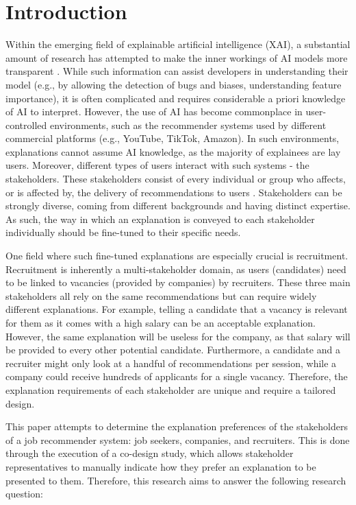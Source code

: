 \section{Introduction}
Within the emerging field of explainable artificial intelligence (XAI), a substantial amount of research has attempted to make the inner workings of AI models more transparent \cite{hagras2018toward,mei2023users}. While such information can assist developers in understanding their model (e.g., by allowing the detection of bugs and biases, understanding feature importance), it is often complicated and requires considerable a priori knowledge of AI to interpret. However, the use of AI has become commonplace in user-controlled environments, such as the recommender systems used by different commercial platforms (e.g., YouTube, TikTok, Amazon). In such environments, explanations cannot assume AI knowledge, as the majority of explainees are lay users. Moreover, different types of users interact with such systems - the stakeholders. These stakeholders consist of every individual or group who affects, or is affected by, the delivery of recommendations to users \cite{abdollahpouri2020multistakeholder}. Stakeholders can be strongly diverse, coming from different backgrounds and having distinct expertise. As such, the way in which an explanation is conveyed to each stakeholder individually should be fine-tuned to their specific needs. 

One field where such fine-tuned explanations are especially crucial is recruitment. Recruitment is inherently a multi-stakeholder domain, as users (candidates) need to be linked to vacancies (provided by companies) by recruiters. These three main stakeholders all rely on the same recommendations but can require widely different explanations. For example, telling a candidate that a vacancy is relevant for them as it comes with a high salary can be an acceptable explanation. However, the same explanation will be useless for the company, as that salary will be provided to every other potential candidate. Furthermore, a candidate and a recruiter might only look at a handful of recommendations per session, while a company could receive hundreds of applicants for a single vacancy. Therefore, the explanation requirements of each stakeholder are unique and require a tailored design. 

This paper attempts to determine the explanation preferences of the stakeholders of a job recommender system: job seekers, companies, and recruiters. This is done through the execution of a co-design study, which allows stakeholder representatives to manually indicate how they prefer an explanation to be presented to them. Therefore, this research aims to answer the following research question: 

